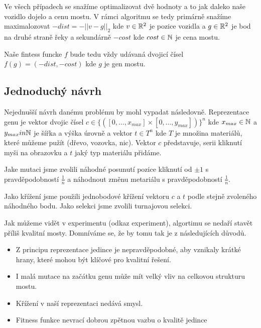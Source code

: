 

Ve všech případech se snažíme optimalizovat dvě hodnoty a to jak daleko naše vozidlo dojelo a cenu mostu. V rámci algoritmu se tedy primárně snažíme maximalozovat $-dist = -||v - g||_2$ kde $v \in \mathbb{R}^2$ je pozice vozidla a $g \in \mathbb{R}^2$ je bod na druhé straně řeky a sekundárně $-cost$ kde $cost \in \mathbb{N}$ je cena mostu.

Naše fintess funcke $f$ bude tedu vždy udávaná dvojicí čísel $f(g) = (-dist, -cost)$ kde $g$ je gen mostu.

\subsection{Jednoduchý návrh}

Nejednušší návrh danému problému by mohl vypadat následovně. Reprezentace genu je vektor dvojic čísel $c \in \{([0, \dots, x_{max}] \times [0, \dots, y_{max}])\}^n$ kde $x_{max} \in \mathbb{N}$ a $y_{max} in \mathbb{N}$ je šířka a výška úrovně a vektor $t \in T^n$ kde $T$ je množina materiálů, které můžeme pužít (dřevo, vozovka, nic). Vektor $c$ představuje, serii kliknutí myši na obrazovku a $t$ jaký typ materiálu přidáme.

Jake mutaci jsme zvolili náhodné posunutí pozice kliknutí od $\pm 1$ s pravděpodobností $\frac{1}{n}$ a náhodnout změnu metariálu s pravděpodobností $\frac{1}{n}$.

Jako křížení jsme použili jednobodové křížení vektoru $c$  a $t$ podle stejně zvoleného náhodného bodu. Jako selekci jsme zvolili turnajovou selekci.

Jak můžeme vidět v experimentu (odkaz experiment), algortimu se nedaří stavět příliš kvalitní mosty. Domníváme se, že by tomu tak je z následujících důvodů.

\begin{itemize}
    \item Z principu reprezentace jedince je nepravděpodobné, aby vznikaly krátké hrany, které mohou být klíčové pro kvalitní řešení.
    \item I malá mutace na začátku genu může mít velký vliv na celkovou strukturu mostu.
    \item Křížení v naší reprezentaci nedává smysl.
    \item Fitness funkce nevrací dobrou zpětnou vazbu o kvalitě jedince 
\end{itemize}

